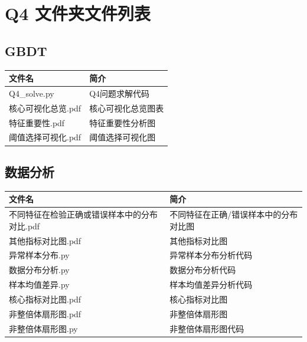 \documentclass[a4paper, oneside, 12pt]{article}
\begin{document}
\section*{Q4 文件夹文件列表}
\subsection*{GBDT}
\begin{table}[H]
    \centering
    \fangsong
    \begin{tabularx}{\textwidth}{>{\RaggedRight}X >{\RaggedRight}X}
        \toprule
        \textbf{文件名} & \textbf{简介} \\
        \midrule
        Q4\_solve.py & Q4问题求解代码    \\
        核心可视化总览.pdf  & 核心可视化总览图表   \\
        特征重要性.pdf    & 特征重要性分析图    \\
        阈值选择可视化.pdf  & 阈值选择可视化图    \\
        \bottomrule
    \end{tabularx}
\end{table}

\subsection*{数据分析}
\begin{table}[H]
    \centering
    \fangsong
    \begin{tabularx}{\textwidth}{>{\RaggedRight}X >{\RaggedRight}X}
        \toprule
        \textbf{文件名}             & \textbf{简介}         \\
        \midrule
        不同特征在检验正确或错误样本中的分布对比.pdf & 不同特征在正确/错误样本中的分布对比图 \\
        其他指标对比图.pdf              & 其他指标对比图             \\
        异常样本分布.py                & 异常样本分布分析代码          \\
        数据分布分析.py                & 数据分布分析代码            \\
        样本均值差异.py                & 样本均值差异分析代码          \\
        核心指标对比图.pdf              & 核心指标对比图             \\
        非整倍体扇形图.pdf              & 非整倍体扇形图             \\
        非整倍体扇形图.py               & 非整倍体扇形图代码           \\
        \bottomrule
    \end{tabularx}
\end{table}
\end{document}
